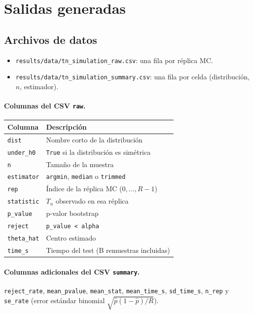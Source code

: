 \documentclass[11pt,a4paper]{article}
\begin{document}
\section{Salidas generadas}

\subsection{Archivos de datos}

\begin{itemize}[leftmargin=*]
    \item \texttt{results/data/tn\_simulation\_raw.csv}: una fila por réplica MC.
    \item \texttt{results/data/tn\_simulation\_summary.csv}: una fila por celda (distribución, $n$, estimador).
\end{itemize}

\paragraph{Columnas del CSV \texttt{raw}.}
\begin{center}
\small
\begin{tabular}{@{}ll@{}}
\toprule
Columna & Descripción \\
\midrule
\texttt{dist} & Nombre corto de la distribución \\
\texttt{under\_h0} & \texttt{True} si la distribución es simétrica \\
\texttt{n} & Tamaño de la muestra \\
\texttt{estimator} & \texttt{argmin}, \texttt{median} o \texttt{trimmed} \\
\texttt{rep} & Índice de la réplica MC ($0,\dots,R-1$) \\
\texttt{statistic} & $T_n$ observado en esa réplica \\
\texttt{p\_value} & p-valor bootstrap \\
\texttt{reject} & \texttt{p\_value < alpha} \\
\texttt{theta\_hat} & Centro estimado \\
\texttt{time\_s} & Tiempo del test (B remuestras incluidas) \\
\bottomrule
\end{tabular}
\end{center}

\paragraph{Columnas adicionales del CSV \texttt{summary}.}
\texttt{reject\_rate}, \texttt{mean\_pvalue}, \texttt{mean\_stat}, \texttt{mean\_time\_s}, \texttt{sd\_time\_s}, \texttt{n\_rep} y \texttt{se\_rate} (error estándar binomial $\sqrt{\hat p(1-\hat p)/R}$).
\end{document}
